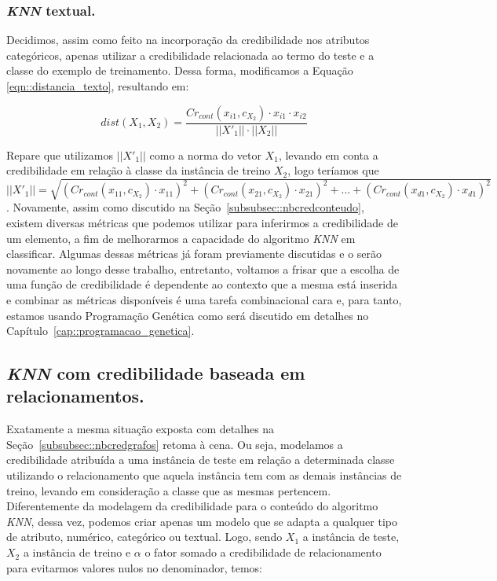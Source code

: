\subsubsection{\textit{KNN} textual.}
\label{subsubsec::knntexto}

Decidimos, assim como feito na incorporação da credibilidade nos atributos categóricos, apenas utilizar a credibilidade relacionada ao termo do teste e a classe do exemplo de treinamento. Dessa forma, modificamos a Equação \ref{eqn::distancia_texto}, resultando em:

\begin{equation}\label{eqn::distancia_texto_cat}
    dist(X_1, X_2) = \frac{  Cr_{cont}(x_{i1}, c_{X_2}) \cdot x_{i1} \cdot x_{i2} }{ ||X'_1|| \cdot ||X_2|| }
\end{equation}

Repare que utilizamos $||X'_1||$ como a norma do vetor $X_1$, levando em conta a credibilidade em relação à classe da instância de treino $X_2$, logo teríamos que $||X'_1|| = \sqrt{ ( Cr_{cont}(x_{11}, c_{X_2}) \cdot x_{11} )^2 + ( Cr_{cont}(x_{21}, c_{X_2}) \cdot x_{21} )^2 +  ... +  ( Cr_{cont}(x_{d1}, c_{X_2}) \cdot  x_{d1} )^2}$.
Novamente, assim como discutido na Seção~\ref{subsubsec::nbcredconteudo}, existem diversas métricas que podemos utilizar para inferirmos a credibilidade de um elemento, a fim de melhorarmos a capacidade do algoritmo \textit{KNN} em classificar. Algumas dessas métricas já foram previamente discutidas e o serão novamente ao longo desse trabalho, entretanto, voltamos a frisar que a escolha de uma função de credibilidade é dependente ao contexto que a mesma está inserida e combinar as métricas disponíveis é uma tarefa combinacional cara e, para tanto, estamos usando Programação Genética como será discutido em detalhes no Capítulo~\ref{cap::programacao_genetica}.

\subsection{\textit{KNN} com credibilidade baseada em relacionamentos.}
\label{subsubsec::knncredgrafos}

Exatamente a mesma situação exposta com detalhes na Seção~\ref{subsubsec::nbcredgrafos} retoma à cena. Ou seja, modelamos a credibilidade atribuída a uma instância de teste em relação a determinada classe utilizando o relacionamento que aquela instância tem com as demais instâncias de treino, levando em consideração a classe que as mesmas pertencem. Diferentemente da modelagem da credibilidade para o conteúdo do algoritmo \textit{KNN}, dessa vez, podemos criar apenas um modelo que se adapta a qualquer tipo de atributo, numérico, categórico ou textual. Logo, sendo $X_1$ a instância de teste, $X_2$ a instância de treino e $\alpha$ o fator somado a credibilidade de relacionamento para evitarmos valores nulos no denominador, temos:

